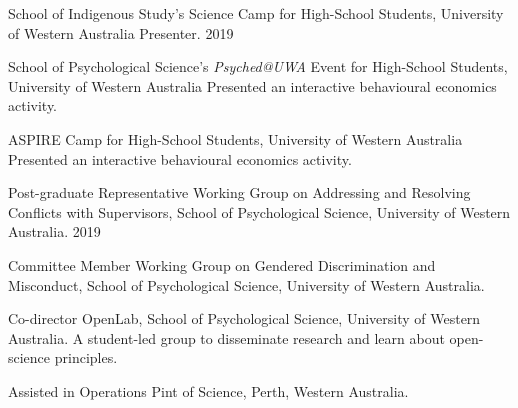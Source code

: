 

\begin{cvhonors}
  \cvhonor
    {School of Indigenous Study's Science Camp for High-School Students, University of Western Australia} %
    {Presenter.} %
    {} %
    {2019} %
    
  \cvhonor
    {School of Psychological Science's \textit{Psyched@UWA} Event for High-School Students, University of Western Australia} %
    {Presented an interactive behavioural economics activity.} %
    {} %
    {} %
    
    \cvhonor
    {ASPIRE Camp for High-School Students, University of Western Australia} %
    {Presented an interactive behavioural economics activity.} %
    {} %
    {} %

    
\end{cvhonors}
\begin{minipage}{\textwidth}
\begin{cvhonors}
    
  \cvhonor
    {Post-graduate Representative} %
    {Working Group on Addressing and Resolving Conflicts with Supervisors, School of Psychological Science, University of Western Australia.} %
    {} %
    {2019} %
    
    \cvhonor
    {Committee Member} %
    {Working Group on Gendered Discrimination and Misconduct, School of Psychological Science, University of Western Australia.} %
    {} %
    {} %
    
    \cvhonor
    {Co-director} %
    {OpenLab, School of Psychological Science, University of Western Australia.
    A student-led group to disseminate research and learn about open-science principles.} %
    {} %
    {} %
    
    \cvhonor
    {Assisted in Operations} %
    {Pint of Science, Perth, Western Australia.
    } %
    {} %
    {} %
    \end{cvhonors}
    \end{minipage}
    
